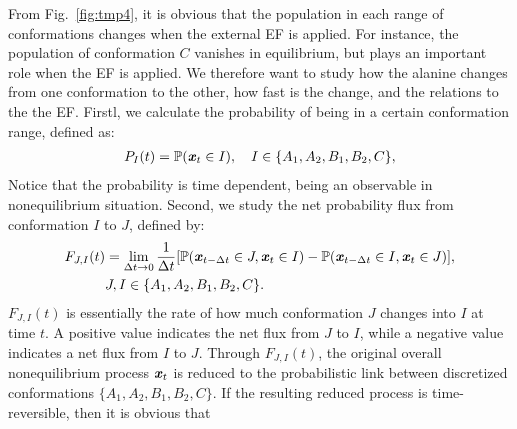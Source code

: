 \documentclass[a4paper,preprint,unsortedaddress,onecolumn]{revtex4-1}
\newcommand{\vect}[1]{\textbf{\textit{#1}}}
\newcommand{\fwd}[0]{\textrm{fwd}}
\newcommand{\bwd}[0]{\textrm{bwd}}
\begin{document}
From Fig.~\ref{fig:tmp4}, it is obvious that the population in each
range of conformations changes when the external EF is applied.
For instance, the population of conformation $C$ vanishes in equilibrium,
but plays an important role when the EF is applied. We
therefore want to study how the alanine changes from one conformation
to the other, how fast is the change, and the relations to the 
the EF. 
Firstl, we calculate the probability of being in a certain conformation range,
defined as:
\begin{align}
  P_I(t) = \mathbb P (\vect x_t \in I), \quad  I \in \{A_1, A_2, B_1, B_2, C\},
\end{align}
Notice that the probability is time dependent, being an observable in nonequilibrium situation.
Second,
we study the net probability flux from conformation $I$ to $J$, defined by:
\begin{align}\nonumber
  F_{J,I}(t) & =\lim_{\Delta t\rightarrow 0} \frac1{\Delta t} [\mathbb P( \vect x_{t-\Delta t} \in J, \vect x_t \in I) - \mathbb P( \vect x_{t-\Delta t} \in I, \vect x_t \in J)], \\\label{eqn:tmp7}
  & J,I \in \{A_1, A_2, B_1, B_2, C\}.
\end{align}
$F_{J,I}(t)$ is essentially the rate of how much conformation $J$ changes
into $I$ at time $t$. A positive value indicates the
net flux from $J$ to $I$,
while a negative value indicates a net flux from $I$ to $J$.
Through $F_{J,I}(t)$, the original overall nonequilibrium process $\vect x_t$
is reduced to the probabilistic link between discretized conformations $\{A_1, A_2, B_1, B_2, C\}$.
If the resulting reduced process 
is time-reversible, then it is obvious that
\end{document}
